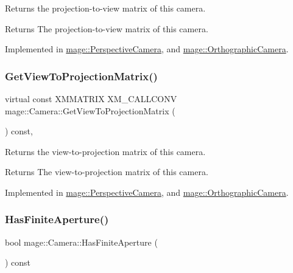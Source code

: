 Returns the projection-\/to-\/view matrix of this camera.

\begin{DoxyReturn}{Returns}
The projection-\/to-\/view matrix of this camera. 
\end{DoxyReturn}


Implemented in \hyperlink{classmage_1_1_perspective_camera_ac0353864cc0eafe5ea6af54b2b860992}{mage\+::\+Perspective\+Camera}, and \hyperlink{classmage_1_1_orthographic_camera_a7bbc235a85877c12b60d1a56d5b65108}{mage\+::\+Orthographic\+Camera}.

\hypertarget{classmage_1_1_camera_a716d842481321b8b4d71da45ab77a7c9}{}\label{classmage_1_1_camera_a716d842481321b8b4d71da45ab77a7c9} 
\subsubsection{\texorpdfstring{Get\+View\+To\+Projection\+Matrix()}{GetViewToProjectionMatrix()}}
{\footnotesize\ttfamily virtual const X\+M\+M\+A\+T\+R\+IX X\+M\+\_\+\+C\+A\+L\+L\+C\+O\+NV mage\+::\+Camera\+::\+Get\+View\+To\+Projection\+Matrix (\begin{DoxyParamCaption}{ }\end{DoxyParamCaption}) const\hspace{0.3cm}{\ttfamily [pure virtual]}, {\ttfamily [noexcept]}}

Returns the view-\/to-\/projection matrix of this camera.

\begin{DoxyReturn}{Returns}
The view-\/to-\/projection matrix of this camera. 
\end{DoxyReturn}


Implemented in \hyperlink{classmage_1_1_perspective_camera_a10348ff23fab164566ffb223a75bf745}{mage\+::\+Perspective\+Camera}, and \hyperlink{classmage_1_1_orthographic_camera_a9ba51750d26d91fa094d82f875c7f1e5}{mage\+::\+Orthographic\+Camera}.

\hypertarget{classmage_1_1_camera_a414cfe9e97f0e42364056e78412fef1a}{}\label{classmage_1_1_camera_a414cfe9e97f0e42364056e78412fef1a} 
\subsubsection{\texorpdfstring{Has\+Finite\+Aperture()}{HasFiniteAperture()}}
{\footnotesize\ttfamily bool mage\+::\+Camera\+::\+Has\+Finite\+Aperture (\begin{DoxyParamCaption}{ }\end{DoxyParamCaption}) const\hspace{0.3cm}{\ttfamily [noexcept]}}

